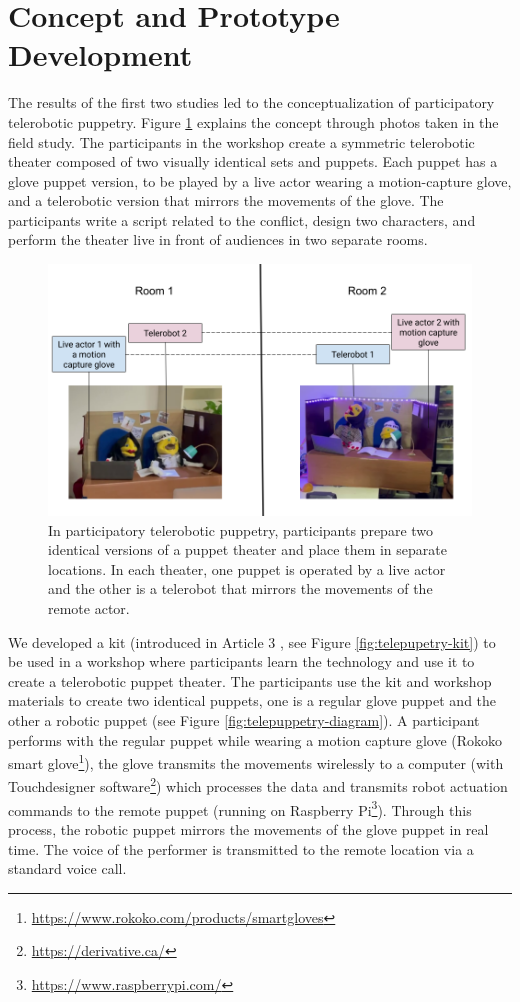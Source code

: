 \documentclass[dissertation,math,vertlayout,pdfa,colorlinks]{aaltoseries}
\begin{document}
\section{Concept and Prototype Development}
The results of the first two studies led to the conceptualization of participatory telerobotic puppetry. Figure \ref{fig:telerobotic_puppetry} explains the concept through photos taken in the field study. The participants in the workshop create a symmetric telerobotic theater composed of two visually identical sets and puppets. Each puppet has a glove puppet version, to be played by a live actor wearing a motion-capture glove, and a telerobotic version that mirrors the movements of the glove. The participants write a script related to the conflict, design two characters, and perform the theater live in front of audiences in two separate rooms.


\begin{figure}
    \centering
    \includegraphics[width=1\linewidth]{Telerobotic puppetry.png}
    \caption{In participatory telerobotic puppetry, participants prepare two identical versions of a puppet theater and place them in separate locations. In each theater, one puppet is operated by a live actor and the other is a telerobot that mirrors the movements of the remote actor.}
    \label{fig:telerobotic_puppetry}
\end{figure}

We developed a kit (introduced in Article 3 \cite{peledTeleroboticTheaterOppressed2025}, see Figure \ref{fig:telepupetry-kit}) to be used in a workshop where participants learn the technology and use it to create a telerobotic puppet theater. The participants use the kit and workshop materials to create two identical puppets, one is a regular glove puppet and the other a robotic puppet (see Figure \ref{fig:telepuppetry-diagram}). A participant performs with the regular puppet while wearing a motion capture glove (Rokoko smart glove\footnote{\url{https://www.rokoko.com/products/smartgloves}}), the glove transmits the movements wirelessly to a computer (with Touchdesigner software\footnote{\url{https://derivative.ca/}}) which processes the data and transmits robot actuation commands to the remote puppet (running on Raspberry Pi\footnote{\url{https://www.raspberrypi.com/}}). Through this process, the robotic puppet mirrors the movements of the glove puppet in real time. The voice of the performer is transmitted to the remote location via a standard voice call.
\end{document}
